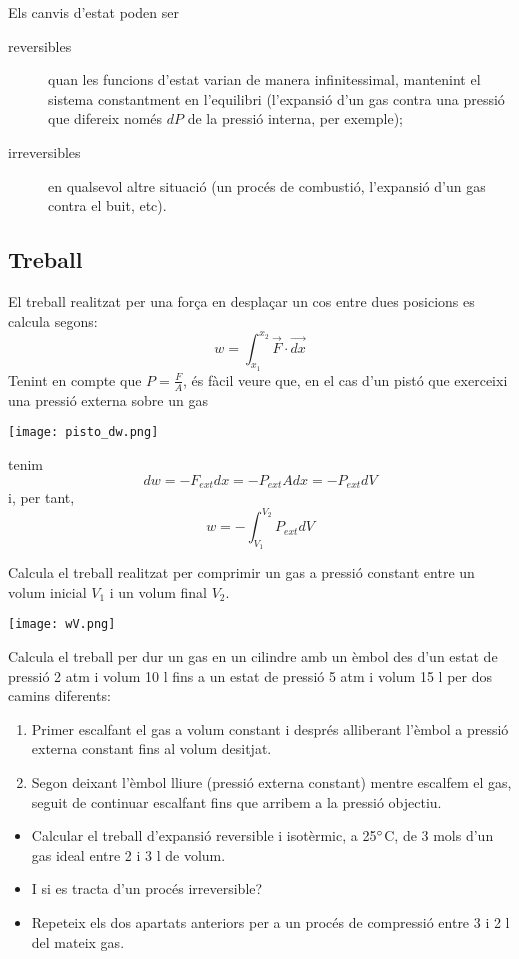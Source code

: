 Els canvis d'estat poden ser 
\begin{description}
\item[reversibles] quan les funcions d'estat varian de manera infinitessimal, mantenint el sistema constantment en l'equilibri (l'expansió d'un gas contra una pressió que difereix només $dP$ de la pressió interna, per exemple);
\item[irreversibles] en qualsevol altre situació (un procés de combustió, l'expansió d'un gas contra el buit, etc).
\end{description}


\subsection{Treball}

El treball realitzat per una força en desplaçar un cos entre dues posicions es calcula segons:
\[
w=\int_{x_1}^{x_2} \vec{F} \cdot \vec{dx}
\]
Tenint en compte que $P=\frac{F}{A}$, és fàcil veure que, en el cas d'un pistó que exerceixi una pressió externa sobre un gas 
\begin{center}
\texttt{[image: pisto\_dw.png]}
\end{center}
tenim
\[
dw=-F_{ext}dx = -P_{ext} A dx = -P_{ext} dV
\]
i, per tant,
\[
w=-\int_{V_1}^{V_2} P_{ext} dV
\]
\begin{exr}
Calcula el treball realitzat per comprimir un gas a pressió constant entre un volum inicial $V_1$ i un volum final $V_2$.
\begin{center}
\texttt{[image: wV.png]}
\end{center}
\end{exr}
\begin{exr}
Calcula el treball per dur un gas en un cilindre amb un èmbol des d'un estat de pressió 2 atm i volum 10 l fins a un estat de pressió 5 atm i volum 15 l per dos camins diferents:
\begin{enumerate}
\item Primer escalfant el gas a volum constant i després alliberant l'èmbol a pressió externa constant fins al volum desitjat.
\item Segon deixant l'èmbol lliure (pressió externa constant) mentre escalfem el gas, seguit de continuar escalfant fins que arribem a la pressió objectiu.  
\end{enumerate}
\end{exr}
\begin{exr}
\begin{itemize}
\item Calcular el treball d'expansió reversible i isotèrmic, a 25$\degree$C, de 3 mols d'un gas ideal entre 2 i 3 l de volum.
\item I si es tracta d'un procés irreversible?
\item Repeteix els dos apartats anteriors per a un procés de compressió entre 3 i 2 l del mateix gas.
\end{itemize}
\end{exr}

